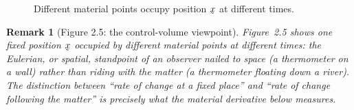 \documentclass[17pt,a4paper]{extreport}
\DeclareRobustCommand{\vek}[1]{\underaccent{\tilde}{#1}}
\newcommand{\blob}[1]{\draw[#1] plot[smooth cycle,tension=0.85] coordinates
  {(0,1.05) (1.15,0.72) (1.5,-0.35) (0.6,-1.15) (-0.75,-0.95) (-1.3,0.05)};}
\newcommand{\bx}{\vek{x}}
\theoremstyle{scplain}
\theoremstyle{scdefn}
\newtheorem{remark}[theorem]{Remark}
\begin{document}
\begin{figure}[htbp]\centering
{}
\caption{Different material points occupy position $\bx$ at different times.}\label{fig:2.5}
\end{figure}

\begin{remark}[Figure 2.5: the control-volume viewpoint]\label{rem:fig5}
Figure~2.5 shows one fixed position $\bx$ occupied by different material
points at different times: the Eulerian, or spatial, standpoint of an
observer nailed to space (a thermometer on a wall) rather than riding with
the matter (a thermometer floating down a river). The distinction between
``rate of change at a fixed place'' and ``rate of change following the
matter'' is precisely what the material derivative below measures.
\end{remark}
\end{document}

